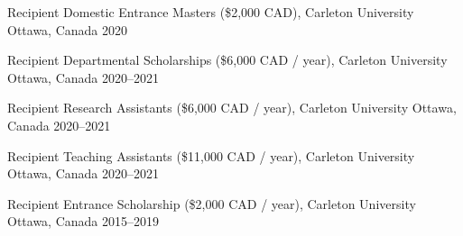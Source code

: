 \begin{cvhonors}


  \cvhonor
    {Recipient} %
    {Domestic Entrance Masters (\$2,000 CAD), Carleton University} %
    {Ottawa, Canada} %
    {2020} %

  \cvhonor
    {Recipient} %
    {Departmental Scholarships (\$6,000 CAD / year), Carleton University} %
    {Ottawa, Canada} %
    {2020--2021} %

  \cvhonor
    {Recipient} %
    {Research Assistants (\$6,000 CAD / year), Carleton University} %
    {Ottawa, Canada} %
    {2020--2021} %

  \cvhonor
    {Recipient} %
    {Teaching Assistants (\$11,000 CAD / year), Carleton University} %
    {Ottawa, Canada} %
    {2020--2021} %

  \cvhonor
    {Recipient} %
    {Entrance Scholarship (\$2,000 CAD / year), Carleton University} %
    {Ottawa, Canada} %
    {2015--2019} %

\end{cvhonors}

